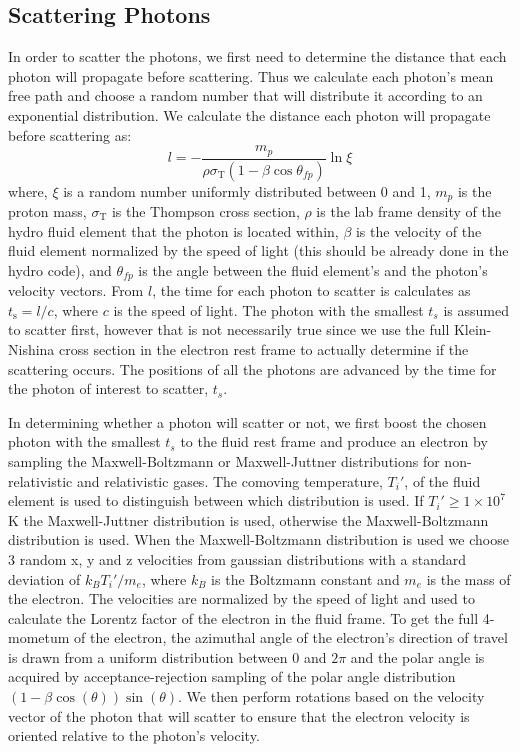 \documentclass[12pt,a4paper]{article}
\begin{document}
\subsection{Scattering Photons} \label{scatt}

In order to scatter the photons, we first need to determine the distance that each photon will propagate before scattering. Thus we calculate each photon's mean free path and choose a random number that will distribute it according to an exponential distribution. We calculate the distance each photon will propagate before scattering as:
\[
l=-\frac{m_p}{\rho\sigma_\mathrm{T}(1-\beta\cos\theta_{fp})}\ln\xi
\]
where, $\xi$ is a random number uniformly distributed between 0 and 1, $m_p$ is the proton mass, $\sigma_\mathrm{T}$ is the Thompson cross section, $\rho$ is the lab frame density of the hydro fluid element that the photon is located within, $\beta$ is the velocity of the fluid element normalized by the speed of light (this should be already done in the hydro code), and $\theta_{fp}$ is the angle between the fluid element's and the photon's velocity vectors. From $l$, the time for each photon to scatter is calculates as $t_\mathrm{s}=l/c$, where $c$ is the speed of light. The photon with the smallest $t_s$ is assumed to scatter first, however that is not necessarily true since we use the full Klein-Nishina cross section in the electron rest frame to actually determine if the scattering occurs. The positions of all the photons are advanced by the time for the photon of interest to scatter, $t_s$.

In determining whether a photon will scatter or not, we first boost the chosen photon with the smallest $t_s$ to the fluid rest frame and produce an electron by sampling the Maxwell-Boltzmann or Maxwell-Juttner distributions for non-relativistic and relativistic gases. The comoving temperature, $T_i'$, of the fluid element is used to distinguish between which distribution is used. If $T_i' \ge 1 \times 10^7$ K the Maxwell-Juttner distribution is used, otherwise the Maxwell-Boltzmann distribution is used. When the Maxwell-Boltzmann distribution is used we choose 3 random x, y and z velocities from gaussian distributions with a standard deviation of $k_BT_i'/m_e$, where $k_B$ is the Boltzmann constant and $m_e$ is the mass of the electron. The velocities are normalized by the speed of light and used to calculate the Lorentz factor of the electron in the fluid frame. To get the full 4-mometum of the electron, the azimuthal angle of the electron's direction of travel is drawn from a uniform distribution between 0 and $2\pi$ and the polar angle is acquired by acceptance-rejection sampling of the polar angle distribution $(1-\beta\cos(\theta))\sin(\theta) $. We then perform rotations based on the velocity vector of the photon that will scatter to ensure that the electron velocity is oriented relative to the photon's velocity.
\end{document}
